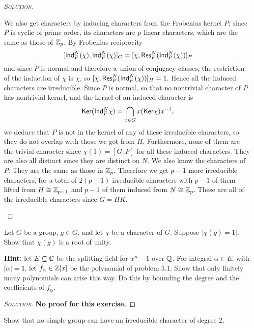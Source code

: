 \begin{proof}[{\scshape Solution}]
\begin{enumerate}[font=\normalfont,label=\textbf{(\Alph*)}, wide]
We also get characters by inducing characters from the Frobenius kernel $P$; since $P$ is cyclic of prime order, its characters are $p$ linear characters, which are the same as those of $\mathbb{Z}_p$. By Frobenius reciprocity
\[
  [\mathsf{Ind}^N_P(\chi), \mathsf{Ind}^N_P(\chi)]_G = [\chi, \mathsf{Res}^N_P(\mathsf{Ind}^N_P(\chi))]_P
\]
and since $P$ is normal and therefore a union of conjugacy classes, the restriction of the induction of $\chi$ is $\chi$, so $[\chi, \mathsf{Res}^N_P(\mathsf{Ind}^N_P(\chi))]_H = 1$. Hence all the induced characters are irreducible. Since $P$ is normal, so that no nontrivial character of $P$ has nontrivial kernel, and the kernel of an induced character is
 \[
    \mathsf{Ker} (\mathsf{Ind}^N_P\chi) = \bigcap_{x\in G}x(\mathsf{Ker}\chi)x^{-1},
 \]
we deduce that $P$ is not in the kernel of any of these irreducible characters, so they do not overlap with those we got from $H$. Furthermore, none of them are the trivial character since $\chi(1) = [G:P]$ for all these induced characters. They are also all distinct since they are distinct on $N$. We also know the characters of $P$: They are the same as those in $\mathbb{Z}_p$. Therefore we get $p-1$ more irreducible characters, for a total of $2(p-1)$ irreducible characters with $p-1$ of them lifted from $H \cong \mathbb{Z}_{p-1}$ and $p-1$ of them induced from $N \cong \mathbb{Z}_p$. These are all of the irreducible characters since $G = HK$.

  \end{enumerate}
\end{proof}

\newpage

\begin{problem}[Isaacs 3.2]
Let $G$ be a group, $g \in G$, and let $\chi$ be a character of $G$. Suppose $\lvert \chi(g) = 1 \rvert$. Show that $\chi(g)$ is a root of unity.

\noindent\textbf{Hint:} let $E \subseteq \mathbb{C}$ be the splitting field for $x^n-1$ over $\mathbb{Q}$. For integral $\alpha \in E$, with $\lvert \alpha \rvert = 1$, let $f_\alpha \in \mathbb{Z}[x]$ be the polynomial of problem 3.1. Show that only finitely many polynomials can arise this way. Do this by bounding the degree and the coefficients of $f_\alpha$.
\end{problem}

\begin{proof}[{\scshape Solution}]
\textbf{No proof for this exercise.}
\end{proof}

\newpage

\begin{problem}[Isaacs 3.3] Show that no simple group can have an irreducible character of degree 2.

\end{problem}

